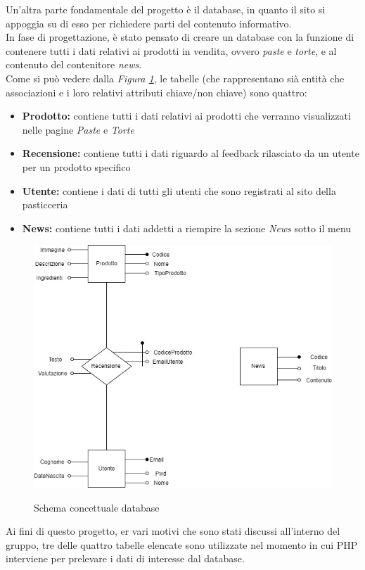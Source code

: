 Un'altra parte fondamentale del progetto è il database, in quanto il sito si appoggia su di esso per richiedere parti del contenuto informativo.\\ 
In fase di progettazione, è stato pensato di creare un database con la funzione di contenere tutti i dati relativi ai prodotti in vendita, ovvero \emph{paste} e \emph{torte}, e al contenuto del contenitore \emph{news}.\\
Come si può vedere dalla \emph{Figura \ref{Fig:schemadb}}, le tabelle (che rappresentano sià entità che associazioni e i loro relativi attributi chiave/non chiave) sono quattro:
\begin{itemize}
		\item \textbf{Prodotto:} contiene tutti i dati relativi ai prodotti che verranno visualizzati nelle pagine \emph{Paste} e \emph{Torte}
		\item \textbf{Recensione:} contiene tutti i dati riguardo al feedback rilasciato da un utente per un prodotto specifico
		\item \textbf{Utente:} contiene i dati di tutti gli utenti che sono registrati al sito della pasticceria
		\item \textbf{News:} contiene tutti i dati addetti a riempire la sezione \emph{News} sotto il menu 
\end{itemize}
\begin{figure}[!h]
	\centering
	\includegraphics[width=0.7\linewidth]{sezioni/Progettazione/Immagini/schema_concettuale.jpg}\\
    \caption{Schema concettuale database}
	\label{Fig:schemadb}
\end{figure}
Ai fini di questo progetto, er vari motivi che sono stati discussi all'interno del gruppo, tre delle quattro tabelle elencate sono utilizzate nel momento in cui PHP interviene per prelevare i dati di interesse dal database.\\

